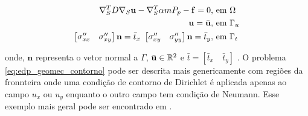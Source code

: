 \begin{equation} \label{eq:edp_geomec_contorno}
\begin{aligned}
     \nabla_S^T D \nabla_S \mathbf{u} - \nabla_S^T\alpha m P_p - \mathbf{f} = 0, & \text{ em }\Omega  \\
     \mathbf{u} = \bar{\mathbf{u}},& \text{ em } \Gamma_u \\
    \begin{bmatrix}
        \sigma_{xx}^{\prime\prime} & \sigma_{xy}^{\prime\prime}
    \end{bmatrix} \mathbf{n} = \bar{t}_x \text{   }     \begin{bmatrix}
        \sigma_{xy}^{\prime\prime} & \sigma_{yy}^{\prime\prime}
    \end{bmatrix} \mathbf{n} = \bar{t}_y, & \text{   em } \Gamma_t 
\end{aligned}  
\end{equation}

onde, $\mathbf{n}$ representa o vetor normal a $\Gamma$,  $\bar{\mathbf{u}} \in \mathbb{R}^2$ e $\bar{t} = [ \bar{t}_x \quad \bar{t}_y ]$  . O problema \eqref{eq:edp_geomec_contorno} pode ser descrita mais genericamente com regiões da fronnteira onde uma condição de contorno de Dirichlet é aplicada apenas ao campo $u_x$ ou $u_y$ enquanto o outro campo tem condição de Neumann. Esse exemplo mais geral pode ser encontrado em \citet{hughes}.
